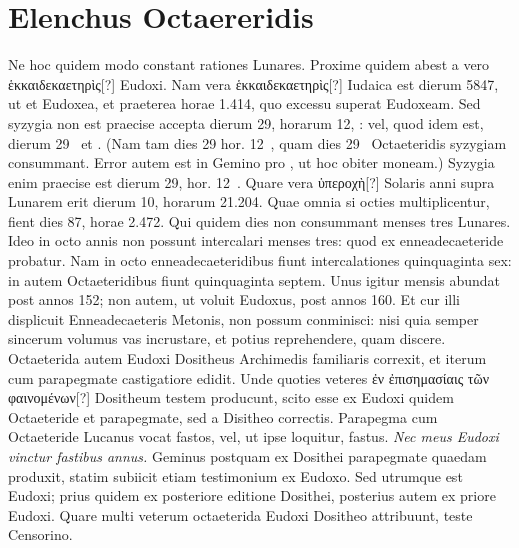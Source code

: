 \section{Elenchus Octaereridis}

Ne hoc quidem modo constant rationes Lunares.
Proxime
quidem abest a vero \textgreek{ἑκκαιδεκαετηρὶς[?]} Eudoxi.
Nam vera \textgreek{ἑκκαιδεκαετηρὶς[?]}
Iudaica est dierum 5847, ut et Eudoxea, et praeterea
horae 1.414, quo excessu superat Eudoxeam.
Sed syzygia non est praecise
accepta dierum 29, horarum 12, : vel, quod idem est,
 dierum 29~
et .
(Nam tam dies 29 hor. 12~, quam dies 29~
 Octaeteridis syzygiam
consummant. Error autem est in Gemino
 pro
 ,
  ut hoc obiter
moneam.)
Syzygia enim praecise est dierum 29, hor. 12~.
Quare
vera \textgreek{ὑπεροχὴ[?]} Solaris anni supra Lunarem erit
 dierum 10, horarum 21.204.
Quae omnia si octies multiplicentur, fient dies 87, horae 2.472.
Qui quidem dies non consummant menses tres Lunares.
Ideo in octo
annis non possunt intercalari menses tres: quod ex enneadecaeteride
probatur.
Nam in octo enneadecaeteridibus fiunt intercalationes
quinquaginta sex: in  autem Octaeteridibus fiunt quinquaginta
septem.
Unus igitur mensis abundat post annos 152; non autem, ut
voluit Eudoxus, post annos 160.
Et cur illi displicuit Enneadecaeteris
Metonis, non possum conminisci: nisi quia semper sincerum volumus
vas incrustare, et potius reprehendere, quam discere.
Octaeterida autem
Eudoxi Dositheus Archimedis familiaris correxit, et iterum cum
parapegmate castigatiore edidit.
Unde quoties veteres \textgreek{ἐν ἐπισημασίαις τῶν φαινομένων[?]}
Dositheum testem producunt, scito esse ex Eudoxi
quidem Octaeteride et parapegmate, sed a Disitheo correctis.
Parapegma
cum Octaeteride Lucanus vocat fastos, vel, ut ipse loquitur, fastus.
\emph{Nec meus Eudoxi vinctur fastibus annus.}
Geminus postquam ex
Dosithei parapegmate quaedam produxit, statim subiicit etiam testimonium
ex Eudoxo.
Sed utrumque est Eudoxi; prius quidem ex posteriore
editione Dosithei, posterius autem ex priore Eudoxi.
Quare
multi veterum octaeterida Eudoxi Dositheo attribuunt, teste Censorino.

